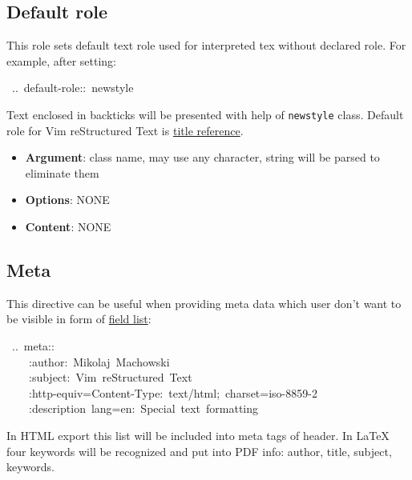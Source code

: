 \documentclass[12pt]{article}
\begin{document}
\subsection{Default role}

This role sets default text role used for interpreted tex without declared
role. For example, after setting:

\begin{ttfamily}\begin{flushleft}
\mbox{~..~default-role::~newstyle}\\
\end{flushleft}\end{ttfamily}

Text enclosed in backticks will be presented with help of \texttt{newstyle} class.
Default role for Vim reStructured Text is \href{\#ltitle-reference}{title reference}.

\begin{itemize}
\item
\textbf{Argument}: class name, may use any character, string will be parsed to
eliminate them

\item
\textbf{Options}: NONE

\item
\textbf{Content}: NONE
\end{itemize}
\hypertarget{lmeta}{}
\subsection{Meta}

This directive can be useful when providing meta data which user don't want to
be visible in form of \href{\#lfield-list}{field list}:

\begin{ttfamily}\begin{flushleft}
\mbox{~..~meta::}\\
\mbox{~~~~:author:~Mikolaj~Machowski}\\
\mbox{~~~~:subject:~Vim~reStructured~Text}\\
\mbox{~~~~:http-equiv=Content-Type:~text/html;~charset=iso-8859-2}\\
\mbox{~~~~:description~lang=en:~Special~text~formatting}\\
\end{flushleft}\end{ttfamily}

In HTML export this list will be included into meta tags of header. In \LaTeX{}
four keywords will be recognized and put into PDF info: author, title,
subject, keywords.
\end{document}
